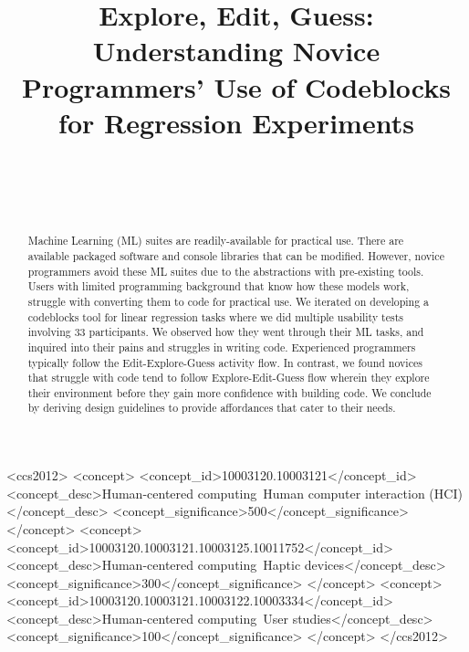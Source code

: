\documentclass{sigchi}
\def\plaintitle{Explore, Edit, Guess: Understanding Novice Programmers' Use of Codeblocks for Regression Experiments}
\begin{document}
\title{\plaintitle}

\author{%
  \\
  \\
  \\
}

\maketitle

\begin{abstract}
%  
Machine Learning (ML) suites are readily-available for practical use. There are available packaged software and console libraries that can be modified. However, novice programmers avoid these ML suites due to the abstractions with pre-existing tools. Users with limited programming background that know how these models work, struggle with converting them to code for practical use. We iterated on developing a codeblocks tool for linear regression tasks where we did multiple usability tests involving 33 participants. We observed how they went through their ML tasks, and inquired into their pains and struggles in writing code. Experienced programmers typically follow the Edit-Explore-Guess activity flow. In contrast, we found novices that struggle with code tend to follow Explore-Edit-Guess flow wherein they explore their environment before they gain more confidence with building code. We conclude by deriving design guidelines to provide affordances that cater to their needs.
\end{abstract}

\begin{CCSXML}
<ccs2012>
<concept>
<concept_id>10003120.10003121</concept_id>
<concept_desc>Human-centered computing~Human computer interaction (HCI)</concept_desc>
<concept_significance>500</concept_significance>
</concept>
<concept>
<concept_id>10003120.10003121.10003125.10011752</concept_id>
<concept_desc>Human-centered computing~Haptic devices</concept_desc>
<concept_significance>300</concept_significance>
</concept>
<concept>
<concept_id>10003120.10003121.10003122.10003334</concept_id>
<concept_desc>Human-centered computing~User studies</concept_desc>
<concept_significance>100</concept_significance>
</concept>
</ccs2012>
\end{CCSXML}
\end{document}
